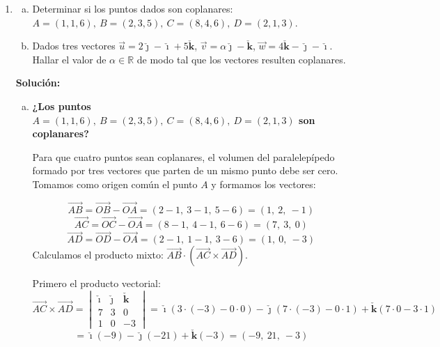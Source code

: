 \documentclass[11pt,a4paper]{article}
\newcommand{\iv}{\bm{\check{\imath}}}
\newcommand{\jv}{\bm{\check{\jmath}}}
\newcommand{\kv}{\check{\bm k}}
\begin{document}
\begin{enumerate}[\hspace{-5mm} 1) ]
Queremos que esta norma sea 3:

\[
\sqrt{5 + (2 - x)^2} = 3
\qquad\Rightarrow\qquad 5 + (2 - x)^2 = 9
\qquad\Rightarrow\qquad  (2 - x)^2 = 4
\qquad\Rightarrow\qquad \]
\[
2 - x = 2 \Rightarrow x = 0 \qquad\textbf{ o }\qquad
2 - x = -2 \Rightarrow x = 4
\]

\textbf{Respuesta:} Los valores de $ x \in \mathbb{R} $ que satisfacen la condición son:
\[
\boxed{x = 0 \qquad \text{ o } \qquad x = 4}
\]



\item 
    \begin{enumerate}[a)]
        \item Determinar si los puntos dados son coplanares:  \ $A = (1, 1, 6), \  B = (2, 3, 5), \  C = (8, 4, 6), \  D = (2, 1, 3)$.
        
        \item Dados tres vectores $ \vec{u} = 2 \jv - \iv + 5 \kv $, $ \vec{v} = \alpha \jv - \kv $, $ \vec{w} = 4 \kv - \jv - \iv $. Hallar el valor de $ \alpha \in \mathbb{R} $ de modo tal que los vectores resulten coplanares.
    \end{enumerate} 









{\bf Solución:}

\begin{enumerate}[a)]
    \item \textbf{¿Los puntos $A = (1, 1, 6), \  B = (2, 3, 5), \  C = (8, 4, 6), \  D = (2, 1, 3)$ son coplanares?}

    Para que cuatro puntos sean coplanares, el volumen del paralelepípedo formado por tres vectores que parten de un mismo punto debe ser cero. Tomamos como origen común el punto $A$ y formamos los vectores:

    \[
    \overrightarrow{AB} = \overrightarrow{OB} - \overrightarrow{OA} = (2{-}1,\ 3{-}1,\ 5{-}6) = (1,\ 2,\ -1)
    \]
    \[
    \overrightarrow{AC} = \overrightarrow{OC} - \overrightarrow{OA} = (8{-}1,\ 4{-}1,\ 6{-}6) = (7,\ 3,\ 0)
    \]
    \[
    \overrightarrow{AD} = \overrightarrow{OD} - \overrightarrow{OA} = (2{-}1,\ 1{-}1,\ 3{-}6) = (1,\ 0,\ -3)
    \] 
    Calculamos el producto mixto: $\overrightarrow{AB} \cdot (\overrightarrow{AC} \times \overrightarrow{AD})$.

    Primero el producto vectorial:
    \[
    \overrightarrow{AC} \times \overrightarrow{AD} =
    \begin{vmatrix}
        \iv & \jv & \kv \\
        7 & 3 & 0 \\
        1 & 0 & -3
    \end{vmatrix}
    = \iv(3\cdot(-3) - 0\cdot0) - \jv(7\cdot(-3) - 0\cdot1) + \kv(7\cdot0 - 3\cdot1)
    \]
    \[
    = \iv(-9) - \jv(-21) + \kv(-3) = (-9,\ 21,\ -3)
    \]


\end{enumerate}
\end{enumerate}
\end{document}

